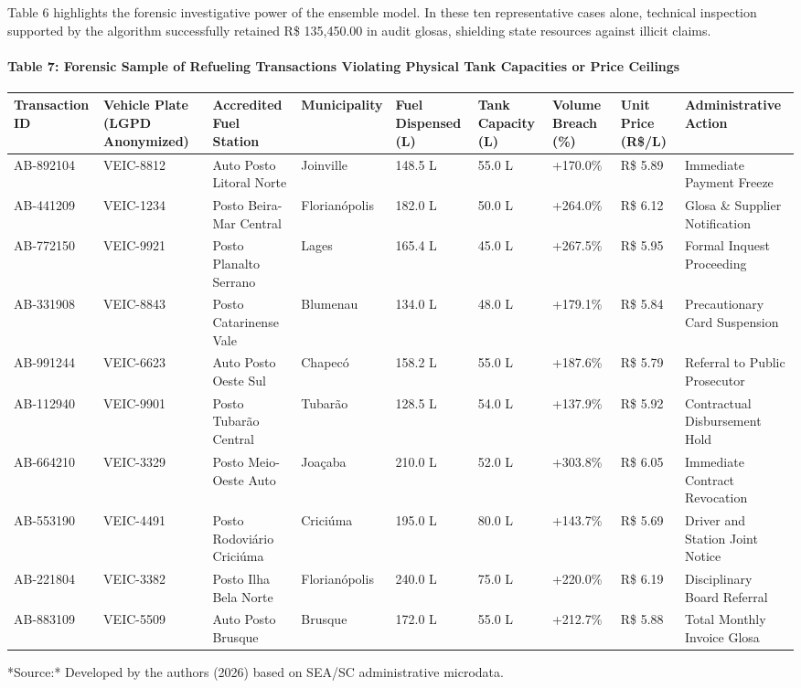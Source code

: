 \documentclass[10pt,a4paper,journal]{article}
\begin{document}
Table 6 highlights the forensic investigative power of the ensemble model. In these ten representative cases alone, technical inspection supported by the algorithm successfully retained R\$ 135,450.00 in audit glosas, shielding state resources against illicit claims.

\paragraph{Table 7: Forensic Sample of Refueling Transactions Violating Physical Tank Capacities or Price Ceilings}
\begin{table}[htbp]
\centering
\small
\begin{tabular}{lllllllll}
\toprule
Transaction ID & Vehicle Plate (LGPD Anonymized) & Accredited Fuel Station & Municipality & Fuel Dispensed (L) & Tank Capacity (L) & Volume Breach (\%) & Unit Price (R\$/L) & Administrative Action \\
\midrule
AB-892104 & VEIC-8812 & Auto Posto Litoral Norte & Joinville & 148.5 L & 55.0 L & +170.0\% & R\$ 5.89 & Immediate Payment Freeze \\
AB-441209 & VEIC-1234 & Posto Beira-Mar Central & Florianópolis & 182.0 L & 50.0 L & +264.0\% & R\$ 6.12 & Glosa \& Supplier Notification \\
AB-772150 & VEIC-9921 & Posto Planalto Serrano & Lages & 165.4 L & 45.0 L & +267.5\% & R\$ 5.95 & Formal Inquest Proceeding \\
AB-331908 & VEIC-8843 & Posto Catarinense Vale & Blumenau & 134.0 L & 48.0 L & +179.1\% & R\$ 5.84 & Precautionary Card Suspension \\
AB-991244 & VEIC-6623 & Auto Posto Oeste Sul & Chapecó & 158.2 L & 55.0 L & +187.6\% & R\$ 5.79 & Referral to Public Prosecutor \\
AB-112940 & VEIC-9901 & Posto Tubarão Central & Tubarão & 128.5 L & 54.0 L & +137.9\% & R\$ 5.92 & Contractual Disbursement Hold \\
AB-664210 & VEIC-3329 & Posto Meio-Oeste Auto & Joaçaba & 210.0 L & 52.0 L & +303.8\% & R\$ 6.05 & Immediate Contract Revocation \\
AB-553190 & VEIC-4491 & Posto Rodoviário Criciúma & Criciúma & 195.0 L & 80.0 L & +143.7\% & R\$ 5.69 & Driver and Station Joint Notice \\
AB-221804 & VEIC-3382 & Posto Ilha Bela Norte & Florianópolis & 240.0 L & 75.0 L & +220.0\% & R\$ 6.19 & Disciplinary Board Referral \\
AB-883109 & VEIC-5509 & Auto Posto Brusque & Brusque & 172.0 L & 55.0 L & +212.7\% & R\$ 5.88 & Total Monthly Invoice Glosa \\
\bottomrule
\end{tabular}
\end{table}
*Source:* Developed by the authors (2026) based on SEA/SC administrative microdata.
\end{document}
